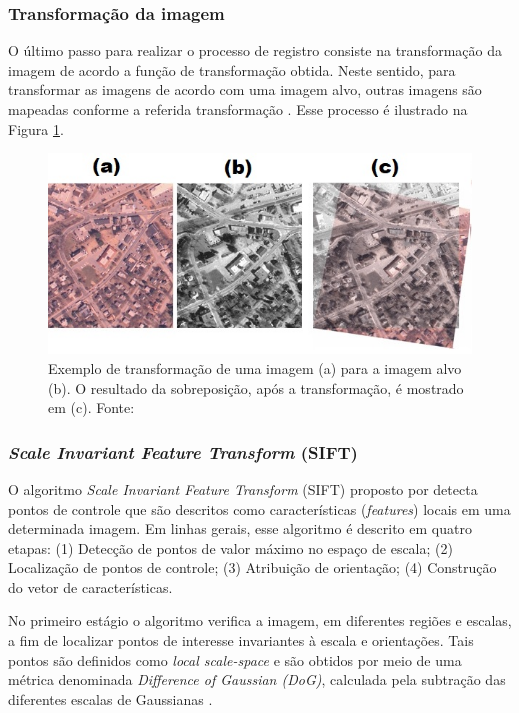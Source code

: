 \documentclass[12pt]{article}
\begin{document}
\subsubsection{Transformação da imagem}

O último passo para realizar o processo de registro consiste na transformação da imagem de acordo a função de transformação obtida. Neste sentido, para transformar as imagens de acordo com uma imagem alvo, outras imagens são mapeadas conforme a referida transformação \cite{Uchida2013ImagePA}. Esse processo é ilustrado na Figura \ref{fig:transformacao_imagem}.

\begin{figure}[!ht]
    \centering
    \includegraphics[width=0.5\textheight]{figures/exampleregistration.jpg}
    \caption{Exemplo de transformação de uma imagem (a) para a imagem alvo (b). O resultado da sobreposição, após a transformação, é mostrado em (c). Fonte: \cite{matlab01}}
    \label{fig:transformacao_imagem}
\end{figure}

\subsubsection{\textit{Scale Invariant Feature Transform} (SIFT)}


O algoritmo \textit{Scale Invariant Feature Transform} (SIFT) proposto por \cite{lowe} detecta pontos de controle que são descritos como características (\textit{features}) locais em uma determinada imagem. Em linhas gerais, esse algoritmo é descrito em quatro etapas: (1) Detecção de pontos de valor máximo no espaço de escala; (2) Localização de pontos de controle; (3) Atribuição de orientação; (4) Construção do vetor de características.

No primeiro estágio o algoritmo verifica a imagem, em diferentes regiões e escalas, a fim de localizar pontos de interesse invariantes à escala e orientações. Tais pontos são definidos como \textit{local scale-space} e são obtidos por meio de uma métrica denominada \textit{Difference of Gaussian (DoG)}, calculada pela subtração das diferentes escalas de Gaussianas \cite{lowe}.
\end{document}
